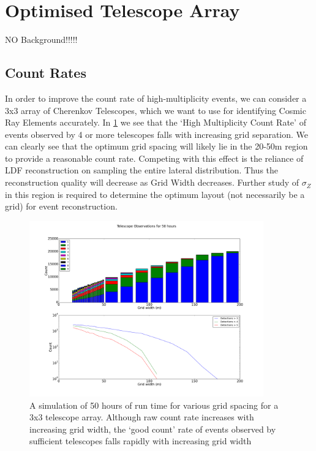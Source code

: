 \documentclass{article}
\begin{document}
\section{Optimised Telescope Array}
NO Background!!!!!
\subsection{Count Rates}

In order to improve the count rate of high-multiplicity events, we can consider a 3x3 array of Cherenkov Telescopes, which we want to use for identifying Cosmic Ray Elements accurately. In \ref{fig:optmiselayout} we see that the \textquoteleft High Multiplicity Count Rate' of events observed by 4 or more telescopes falls with increasing grid separation. We can clearly see that the optimum grid spacing will likely lie in the 20-50m region to provide a reasonable count rate. Competing with this effect is the reliance of LDF reconstruction on sampling the entire lateral distribution. Thus the reconstruction quality will decrease as Grid Width decreases. Further study of $\sigma_{Z}$ in this region is required to determine the optimum layout (not necessarily be a grid) for event reconstruction. 

\begin{figure}
\begin{center}
\includegraphics[width=0.9\textwidth]{optimiselayout}
\caption{A simulation of 50 hours of run time for various grid spacing for a 3x3 telescope array. Although raw count rate increases with increasing grid width, the \textquoteleft good count' rate of events observed by sufficient telescopes falls rapidly with increasing grid width}
\label{fig:optmiselayout}
\end{center}
\end{figure}
\end{document}

